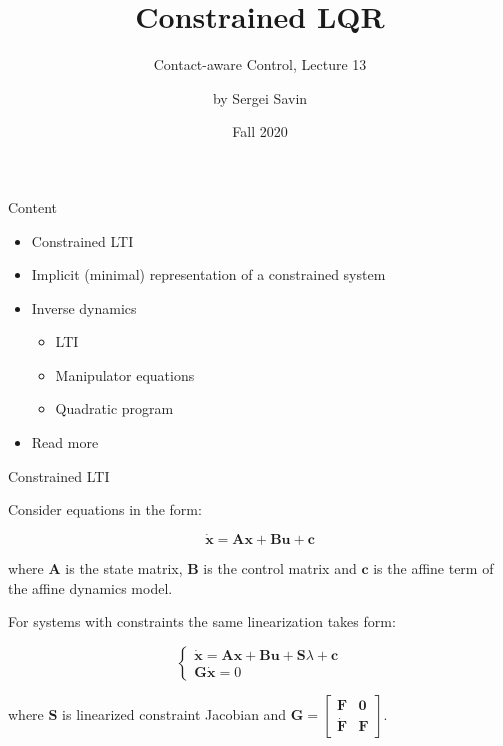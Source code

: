 \documentclass{beamer}
\title{Constrained LQR}
\subtitle{Contact-aware Control, Lecture 13}
\author{by Sergei Savin}
\date{Fall 2020}
\begin{document}
\maketitle


\begin{frame}{Content}

\begin{itemize}
\item Constrained LTI
\item Implicit (minimal) representation of a constrained system
\item Inverse dynamics
\begin{itemize}
    \item LTI
    \item Manipulator equations
    \item Quadratic program
\end{itemize}
\item Read more
\end{itemize}

\end{frame}



\begin{frame}{Constrained LTI}
\begin{flushleft}

Consider equations in the form:

\begin{equation}
\label{eq:LTI}
    \dot{\mathbf{x}} = \mathbf{A} \mathbf{x} + \mathbf{B} \mathbf{u} + \mathbf{c}
\end{equation}

where $\mathbf{A}$ is the state matrix, $\mathbf{B}$ is the control matrix and $\mathbf{c}$ is the affine term of the affine dynamics model.

\bigskip

For systems with constraints the same linearization takes form:

\begin{equation}
\label{eq:CLTI}
\begin{cases}
    \dot{\mathbf{x}} = \mathbf{A} \mathbf{x} + \mathbf{B} \mathbf{u} + \mathbf{S} \lambda + \mathbf{c} \\
    \mathbf{G}\dot{\mathbf{x}} = 0
\end{cases}    
\end{equation}

where $\mathbf{S}$ is linearized constraint Jacobian and $\mathbf{G} = \begin{bmatrix} \mathbf{F} & \mathbf{0} \\ \dot{\mathbf{F}} & \mathbf{F} \end{bmatrix}$. 

\end{flushleft}
\end{frame}
\end{document}
